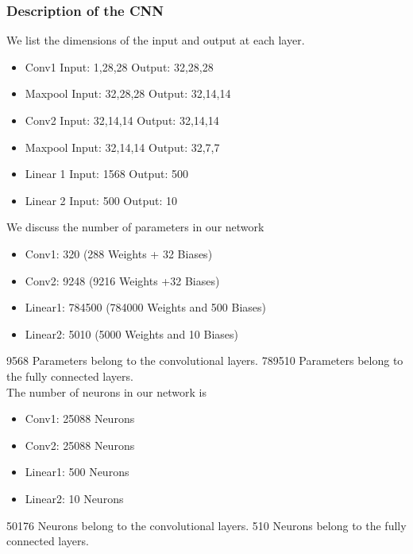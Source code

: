 \documentclass[11pt, a4paper]{article}
\begin{document}
\subsubsection{Description of the CNN}
We list the dimensions of the input and output at each layer. 
\begin{itemize}
    \item Conv1 Input: 1,28,28 Output: 32,28,28
    \item Maxpool Input: 32,28,28 Output: 32,14,14
    \item Conv2 Input: 32,14,14 Output: 32,14,14
    \item Maxpool Input: 32,14,14 Output: 32,7,7
    \item Linear 1 Input: 1568 Output: 500
    \item Linear 2 Input: 500 Output: 10
\end{itemize}
We discuss the number of parameters in our network
\begin{itemize}
    \item Conv1: 320 (288 Weights + 32 Biases)
    \item Conv2: 9248 (9216 Weights +32 Biases)
    \item Linear1: 784500 (784000 Weights and 500 Biases)
    \item Linear2: 5010 (5000 Weights and 10 Biases)
\end{itemize}
9568 Parameters belong to the convolutional layers.
789510 Parameters belong to the fully connected layers.
\\
The number of neurons in our network is
\begin{itemize}
    \item Conv1: 25088 Neurons
    \item Conv2: 25088 Neurons
    \item Linear1: 500 Neurons
    \item Linear2: 10 Neurons
\end{itemize}
50176 Neurons belong to the convolutional layers.
510 Neurons belong to the fully connected layers.
\\
\end{document}
